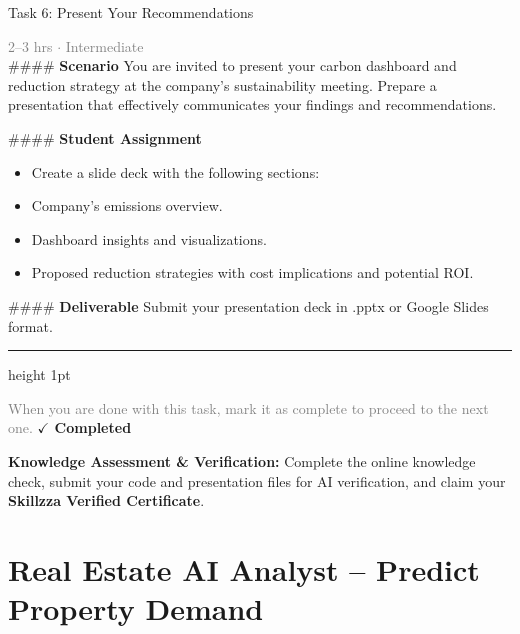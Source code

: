 \documentclass[10pt,a4paper]{article}
\begin{document}
\begin{taskbox}{Task 6: Present Your Recommendations}

    {\small \textcolor{gray}{2--3 hrs $\cdot$ Intermediate}}\\[12pt]

    \#\#\#\# \textbf{Scenario}  
You are invited to present your carbon dashboard and reduction strategy at the company’s sustainability meeting. Prepare a presentation that effectively communicates your findings and recommendations.

\#\#\#\# \textbf{Student Assignment}
\begin{itemize}
    \item Create a slide deck with the following sections:  
    \item Company’s emissions overview.  
    \item Dashboard insights and visualizations.  
    \item Proposed reduction strategies with cost implications and potential ROI.  
\end{itemize}

\#\#\#\# \textbf{Deliverable}  
Submit your presentation deck in .pptx or Google Slides format.\par

    \vspace{16pt}

    \textcolor{cardBorder}{\hrule height 1pt}\vspace{8pt}

    \small \textcolor{gray}{When you are done with this task, mark it as complete to proceed to the next one.} \hfill \textbf{\textcolor{brandDark}{$\checkmark$ Completed}}

\end{taskbox}

\begin{completionbox}
    \textbf{Knowledge Assessment \& Verification:} Complete the online knowledge check, submit your code and presentation files for AI verification, and claim your \textbf{Skillzza Verified Certificate}.
\end{completionbox}

\newpage




\section*{Real Estate AI Analyst – Predict Property Demand}
\end{document}
